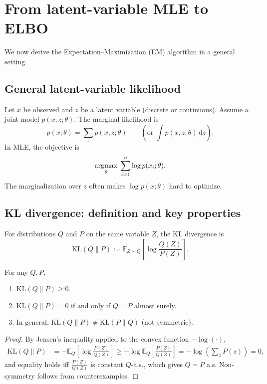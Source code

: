\documentclass[../main]{subfiles}
\begin{document}
\section{From latent-variable MLE to ELBO}
We now derive the Expectation--Maximization (EM) algorithm in a general setting.

\subsection{General latent-variable likelihood}
Let $x$ be observed and $z$ be a latent variable (discrete or continuous).
Assume a joint model $p(x,z;\theta)$. The marginal likelihood is
\begin{equation}
    p(x;\theta) = \sum_z p(x,z;\theta)\qquad
    (\text{or } \int p(x,z;\theta)\,\mathrm dz).
\end{equation}
In MLE, the objective is
\begin{equation}
    \mathop{\mathrm{argmax}}_{\theta}\; \sum_{i=1}^n \log p(x_i;\theta).
\end{equation}
The marginalization over $z$ often makes $\log p(x;\theta)$ hard to optimize.

\subsection{KL divergence: definition and key properties}
\begin{definition}
    For distributions $Q$ and $P$ on the same variable $Z$, the KL divergence
    is
    \begin{equation}
        \mathrm{KL}(Q\|P)
        := \mathbb E_{Z\sim Q}\!\left[\log\frac{Q(Z)}{P(Z)}\right].
    \end{equation}
\end{definition}

\begin{proposition}\label{prop:kl-basic}
    For any $Q,P$,
    \begin{enumerate}
        \item $\mathrm{KL}(Q\|P)\ge 0$.
        \item $\mathrm{KL}(Q\|P)=0$ if and only if $Q=P$ almost surely.
        \item In general, $\mathrm{KL}(Q\|P)\neq \mathrm{KL}(P\|Q)$ (not symmetric).
    \end{enumerate}
\end{proposition}
\begin{proof}
    By Jensen's inequality applied to the convex function $-\log(\cdot)$,
    \begin{align*}
        \mathrm{KL}(Q\|P)
        &= -\mathbb E_{Q}\!\left[\log \frac{P(Z)}{Q(Z)}\right]
        \ge -\log \mathbb E_{Q}\!\left[\frac{P(Z)}{Q(Z)}\right]
        = -\log\!\left(\sum_z P(z)\right)
        = 0,
    \end{align*}
    and equality holds iff $\frac{P(Z)}{Q(Z)}$ is constant $Q$-a.s., which gives
    $Q=P$ a.s.  Non-symmetry follows from counterexamples.
\end{proof}
\end{document}
